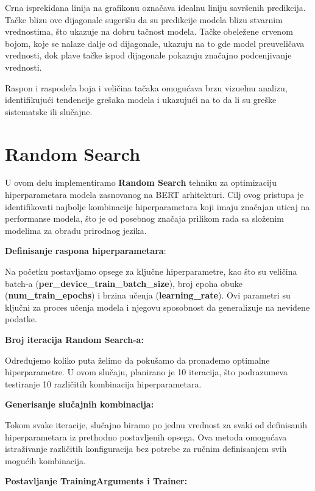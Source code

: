 \documentclass{article}
\begin{document}
Crna isprekidana linija na grafikonu označava idealnu liniju savršenih predikcija. Tačke blizu ove dijagonale sugerišu da su predikcije modela blizu stvarnim vrednostima, što ukazuje na dobru tačnost modela. Tačke obeležene crvenom bojom, koje se nalaze dalje od dijagonale, ukazuju na to gde model preuveličava vrednosti, dok plave tačke ispod dijagonale pokazuju značajno podcenjivanje vrednosti.

Raspon i raspodela boja i veličina tačaka omogućava brzu vizuelnu analizu, identifikujući tendencije grešaka modela i ukazujući na to da li su greške sistematske ili slučajne.


\section{Random Search}

U ovom delu implementiramo \textbf{Random Search} tehniku za optimizaciju hiperparametara modela zasnovanog na BERT arhitekturi. Cilj ovog pristupa je identifikovati najbolje kombinacije hiperparametara koji imaju značajan uticaj na performanse modela, što je od posebnog značaja prilikom rada sa složenim modelima za obradu prirodnog jezika.

\vspace{1em}
\textbf{Definisanje raspona hiperparametara}:


Na početku postavljamo opsege za ključne hiperparametre, kao što su veličina batch-a (\textbf{per\_device\_train\_batch\_size}), broj epoha obuke (\textbf{num\_train\_epochs}) i brzina učenja (\textbf{learning\_rate}). Ovi parametri su ključni za proces učenja modela i njegovu sposobnost da generalizuje na neviđene podatke.

\vspace{1em}
\textbf{Broj iteracija Random Search-a:}

Određujemo koliko puta želimo da pokušamo da pronađemo optimalne hiperparametre. U ovom slučaju, planirano je 10 iteracija, što podrazumeva testiranje 10 različitih kombinacija hiperparametara.

\newpage
\textbf{Generisanje slučajnih kombinacija:}

Tokom svake iteracije, slučajno biramo po jednu vrednost za svaki od definisanih hiperparametara iz prethodno postavljenih opsega. Ova metoda omogućava istraživanje različitih konfiguracija bez potrebe za ručnim definisanjem svih mogućih kombinacija.

\vspace{1em}
\textbf{Postavljanje TrainingArguments i Trainer:}
\end{document}
